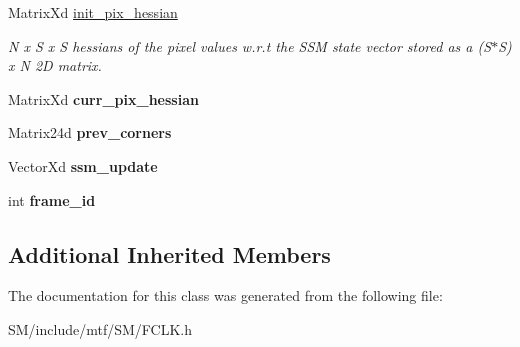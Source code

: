 \begin{DoxyCompactItemize}
\item 
\hypertarget{classFCLK_ac4141b5f334dbffb97e46dac6aa493f5}{Matrix\-Xd \hyperlink{classFCLK_ac4141b5f334dbffb97e46dac6aa493f5}{init\-\_\-pix\-\_\-hessian}}\label{classFCLK_ac4141b5f334dbffb97e46dac6aa493f5}

\begin{DoxyCompactList}\small\item\em N x S x S hessians of the pixel values w.\-r.\-t the S\-S\-M state vector stored as a (S$\ast$\-S) x N 2\-D matrix. \end{DoxyCompactList}\item 
\hypertarget{classFCLK_a838cd36940df8b2b5063854bf602ce59}{Matrix\-Xd {\bfseries curr\-\_\-pix\-\_\-hessian}}\label{classFCLK_a838cd36940df8b2b5063854bf602ce59}

\item 
\hypertarget{classFCLK_aaf7115aebc182fb22c106e605c229a26}{Matrix24d {\bfseries prev\-\_\-corners}}\label{classFCLK_aaf7115aebc182fb22c106e605c229a26}

\item 
\hypertarget{classFCLK_a1b1f9ca4b00aea40e9ae738bf1fa712c}{Vector\-Xd {\bfseries ssm\-\_\-update}}\label{classFCLK_a1b1f9ca4b00aea40e9ae738bf1fa712c}

\item 
\hypertarget{classFCLK_afa536f739236a83f70c266ab809e1dad}{int {\bfseries frame\-\_\-id}}\label{classFCLK_afa536f739236a83f70c266ab809e1dad}

\end{DoxyCompactItemize}
\subsection*{Additional Inherited Members}


The documentation for this class was generated from the following file\-:\begin{DoxyCompactItemize}
\item 
S\-M/include/mtf/\-S\-M/F\-C\-L\-K.\-h\end{DoxyCompactItemize}
